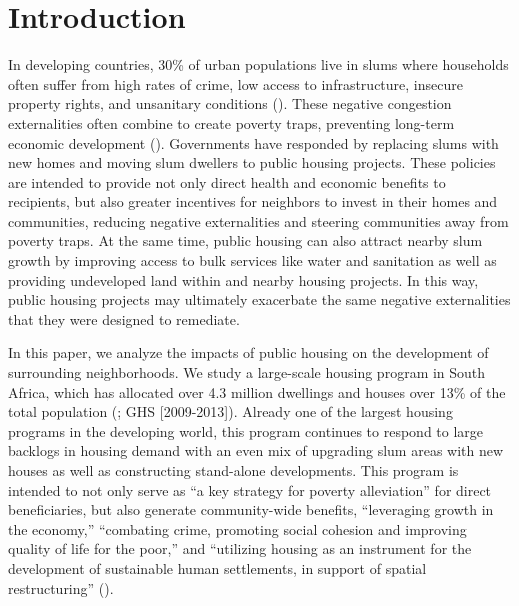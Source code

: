 \documentclass[12pt]{article}
\begin{document}
\doublespacing

\section{Introduction} \label{sec:introduction}

In developing countries, 30\% of urban populations live in slums where households often suffer from high rates of crime, low access to infrastructure, insecure property rights, and unsanitary conditions (\cite{mdg}).  These negative congestion externalities often combine to create poverty traps, preventing long-term economic development (\cite{10.1257/jep.27.4.187}). Governments have responded by replacing slums with new homes and moving slum dwellers to public housing projects.  These policies are intended to provide not only direct health and economic benefits to recipients, but also greater incentives for neighbors to invest in their homes and communities, reducing negative externalities and steering communities away from poverty traps.  At the same time, public housing can also attract nearby slum growth by improving access to bulk services like water and sanitation as well as providing undeveloped land within and nearby housing projects.  In this way, public housing projects may ultimately exacerbate the same negative externalities that they were designed to remediate.


In this paper, we analyze the impacts of public housing on the development of surrounding neighborhoods.  We study a large-scale housing program in South Africa, which has allocated over 4.3 million dwellings and houses over 13\% of the total population (\cite{dhsreports}; GHS [2009-2013]).  Already one of the largest housing programs in the developing world, this program continues to respond to large backlogs in housing demand with an even mix of upgrading slum areas with new houses as well as constructing stand-alone developments.  This program is intended to not only serve as ``a key strategy for poverty alleviation'' for direct beneficiaries, but also generate community-wide benefits, ``leveraging growth in the economy,'' ``combating crime, promoting social cohesion and improving quality of life for the poor,'' and ``utilizing housing as an instrument for the development of sustainable human settlements, in support of spatial restructuring'' (\cite{bng}). 
\end{document}

